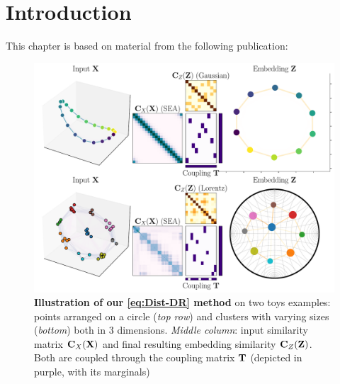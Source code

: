 

\section{Introduction}

This chapter is based on material from the following publication:

\begin{mdframed}
\begin{center} 
\end{center}
\end{mdframed}

\begin{figure}[!ht]
	\begin{center}
	\centerline{\includegraphics[width=\columnwidth]{figures/DistR/fig_general.pdf}}
	\caption{\textbf{Illustration of our \ref{eq:Dist-DR} method} on two toys examples: points arranged on a circle ({\em top row}) and clusters with varying sizes ({\em bottom}) both in 3 dimensions. {\em Middle column}: input similarity matrix ${\mathbf{C}}_X({\mathbf{X}})$ and final resulting embedding similarity ${\mathbf{C}}_Z({\mathbf{Z}})$. Both are coupled through the coupling matrix ${\mathbf{T}}$ (depicted in purple, with its marginals)}
	\label{fig:general_idea}
	\end{center}
	\vskip -0.3in
\end{figure}

